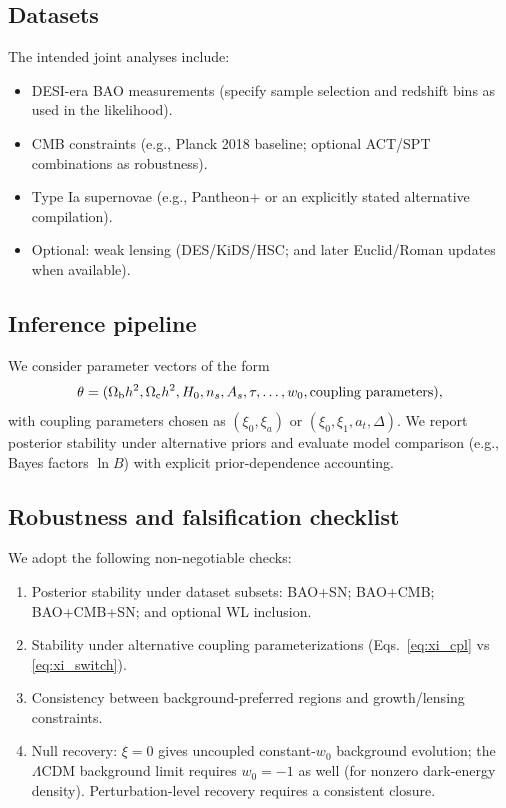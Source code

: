 \documentclass[11pt]{article}
\newcommand{\LCDM}{\ensuremath{\Lambda\mathrm{CDM}}\xspace}
\begin{document}
\subsection{Datasets}

The intended joint analyses include:
\begin{itemize}
\item DESI-era BAO measurements (specify sample selection and redshift bins as used in the likelihood).
\item CMB constraints (e.g., Planck 2018 baseline; optional ACT/SPT combinations as robustness).
\item Type Ia supernovae (e.g., Pantheon+ or an explicitly stated alternative compilation).
\item Optional: weak lensing (DES/KiDS/HSC; and later Euclid/Roman updates when available).
\end{itemize}

\subsection{Inference pipeline}

We consider parameter vectors of the form
\begin{equation}
\theta = (\Omega_{\rm b}h^2,\Omega_{\rm c}h^2, H_0, n_s, A_s, \tau, \ldots, w_0, \text{coupling parameters}),
\end{equation}
with coupling parameters chosen as $(\xi_0,\xi_a)$ or $(\xi_0,\xi_1,a_t,\Delta)$.
We report posterior stability under alternative priors and evaluate model comparison (e.g., Bayes factors $\ln B$) with explicit prior-dependence accounting.

\subsection{Robustness and falsification checklist}

We adopt the following non-negotiable checks:
\begin{enumerate}
\item Posterior stability under dataset subsets: BAO+SN; BAO+CMB; BAO+CMB+SN; and optional WL inclusion.
\item Stability under alternative coupling parameterizations (Eqs.~\eqref{eq:xi_cpl} vs \eqref{eq:xi_switch}).
\item Consistency between background-preferred regions and growth/lensing constraints.
\item Null recovery: $\xi=0$ gives uncoupled constant-$w_0$ background evolution; the \LCDM background limit requires $w_0=-1$ as well (for nonzero dark-energy density). Perturbation-level recovery requires a consistent closure.
\end{enumerate}
\end{document}
